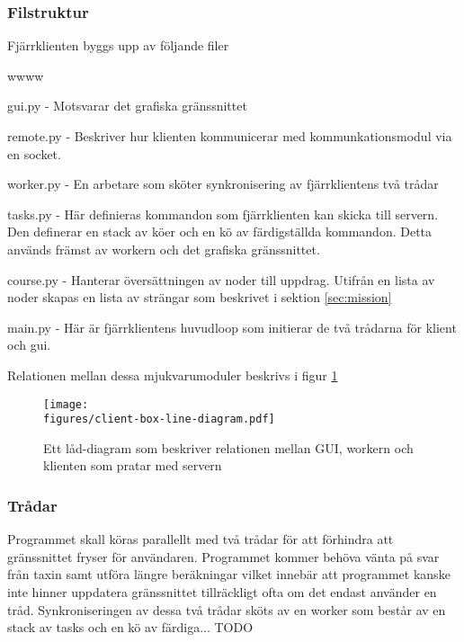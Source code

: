 \documentclass[tekniskrapport/tech.tex]{subfiles}
\begin{document}
\subsubsection{Filstruktur}
Fjärrklienten byggs upp av följande filer

\begin{labeling}{wwww}
	\item[gui.py] - Motsvarar det grafiska gränssnittet
	
	\item[remote.py] - Beskriver hur klienten kommunicerar med
		kommunkationsmodul via en socket.

	\item[worker.py] - En arbetare som sköter synkronisering av
		fjärrklientens två trådar
	
	\item[tasks.py] - Här definieras kommandon som fjärrklienten kan skicka
		till servern. Den definerar en stack av köer och en kö av
		färdigställda kommandon.  Detta används främst av workern och
		det grafiska gränssnittet.
    
    \item[course.py] - Hanterar översättningen av noder till uppdrag. Utifrån
    en lista av noder skapas en lista av strängar som beskrivet i sektion
    \ref{sec:mission}

    \item[main.py] - Här är fjärrklientens huvudloop som initierar de två
    trådarna för klient och gui.

\end{labeling}
Relationen mellan dessa mjukvarumoduler beskrivs i figur \ref{boxclient}

\begin{figure}[h]
\centering
	\texttt{[image: \\figures/client-box-line-diagram.pdf]}
	\caption{Ett låd-diagram som beskriver relationen mellan GUI,
	workern och klienten som pratar med servern}
	\label{boxclient}
\end{figure} 

\subsubsection{Trådar}
Programmet skall köras parallellt med två trådar för att förhindra att
gränssnittet fryser för användaren. Programmet kommer behöva vänta på svar från
taxin samt utföra längre beräkningar vilket innebär att programmet kanske inte
hinner uppdatera gränssnittet tillräckligt ofta om det endast använder en tråd.
Synkroniseringen av dessa två trådar sköts av en worker som består av
en stack av tasks och en kö av färdiga... TODO
\end{document}
